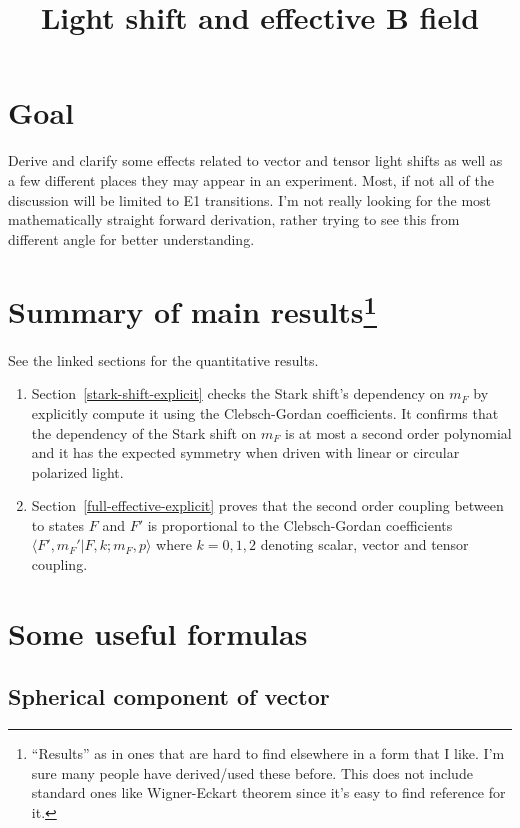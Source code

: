 \documentclass[10pt,fleqn]{article}
\title{Light shift and effective B field}
\begin{document}
\maketitle

\section{Goal}
Derive and clarify some effects related to vector and tensor light shifts
as well as a few different places they may appear in an experiment.
Most, if not all of the discussion will be limited to E1 transitions.
I'm not really looking for the most mathematically straight forward derivation,
rather trying to see this from different angle for better understanding.

\section[Summary of main results]{Summary of main results\protect\footnote{``Results'' as in ones that are hard to find elsewhere in a form that I like. I'm sure many people have derived/used these before. This does not include standard ones like Wigner-Eckart theorem since it's easy to find reference for it.}}

See the linked sections for the quantitative results.
\begin{enumerate}
\item Section~\ref{stark-shift-explicit} checks the Stark shift's dependency
  on $m_F$ by explicitly compute it using the Clebsch-Gordan coefficients.
  It confirms that {\color{blue}the dependency of the Stark shift on $m_F$
  is at most a second order polynomial} and it has the expected symmetry
  when driven with linear or circular polarized light.
\item Section~\ref{full-effective-explicit} proves that the second order coupling
  between to states $F$ and $F'$ is proportional to the Clebsch-Gordan coefficients
  $\langle F',m_F'|F,k;m_F,p\rangle$ where $k=0,1,2$ denoting
  scalar, vector and tensor coupling.
\end{enumerate}

\section{Some useful formulas}

\subsection{Spherical component of vector}
\end{document}
